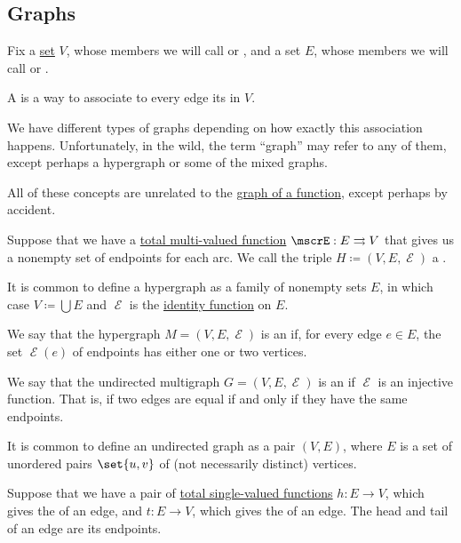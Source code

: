 \subsection{Graphs}\label{subsec:graphs}

\begin{definition}\label{def:graph}
  Fix a \hyperref[def:set]{set} \( V \), whose members we will call  or , and a set \( E \), whose members we will call  or .

  A  is a way to associate to every edge its  in \( V \).

  We have different types of graphs depending on how exactly this association happens. Unfortunately, in the wild, the term \enquote{graph} may refer to any of them, except perhaps a hypergraph or some of the mixed graphs.

  All of these concepts are unrelated to the \hyperref[def:multi_valued_function/graph]{graph of a function}, except perhaps by accident.

  \begin{thmenum}[series=def:graph]
     Suppose that we have a \hyperref[def:multi_valued_function/total]{total multi-valued function} \( \mscrE: E \multto V \) that gives us a nonempty set of endpoints for each arc. We call the triple \( H \coloneqq (V, E, \mscrE) \) a .

    It is common to define a hypergraph as a family of nonempty sets \( E \), in which case \( V \coloneqq \bigcup E \) and \( \mscrE \) is the \hyperref[def:multi_valued_function/identity]{identity function} on \( E \).

     We say that the hypergraph \( M = (V, E, \mscrE) \) is an  if, for every edge \( e \in E \), the set \( \mscrE(e) \) of endpoints has either one or two vertices.

     We say that the undirected multigraph \( G = (V, E, \mscrE) \) is an  if \( \mscrE \) is an injective function. That is, if two edges are equal if and only if they have the same endpoints.

    It is common to define an undirected graph as a pair \( (V, E) \), where \( E \) is a set of unordered pairs \( \set{ u, v } \) of (not necessarily distinct) vertices.

     Suppose that we have a pair of \hyperref[def:function]{total single-valued functions} \( h: E \to V \), which gives the  of an edge, and \( t: E \to V \), which gives the  of an edge. The head and tail of an edge are its endpoints.


\end{thmenum}
\end{definition}
